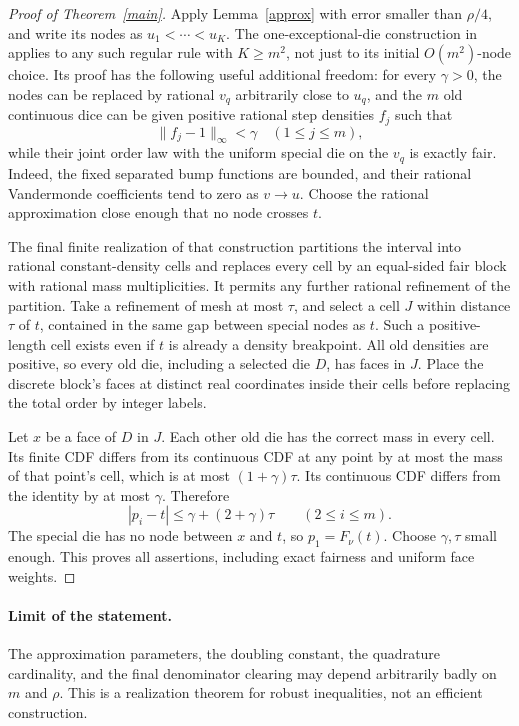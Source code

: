 \documentclass[11pt]{article}
\begin{document}
\begin{proof}[Proof of Theorem~\ref{main}]
Apply Lemma~\ref{approx} with error smaller than $\rho/4$, and write
its nodes as $u_1<\cdots<u_K$. The one-exceptional-die construction
in  applies to any
such regular rule with $K\ge m^2$, not just to its initial
$O(m^2)$-node choice. Its proof has the following useful additional
freedom: for every $\gamma>0$, the nodes can be replaced by rational
$v_q$ arbitrarily close to $u_q$, and the $m$ old continuous dice
can be given positive rational step densities $f_j$ such that
\[
 \|f_j-1\|_\infty<\gamma\quad(1\le j\le m),
\]
while their joint order law with the uniform special die on the
$v_q$ is exactly fair. Indeed, the fixed separated bump functions
are bounded, and their rational Vandermonde coefficients tend to
zero as $v\to u$. Choose the rational approximation close enough
that no node crosses $t$.

The final finite realization of that construction partitions the
interval into rational constant-density cells and replaces every
cell by an equal-sided fair block with rational mass multiplicities.
It permits any further rational refinement of the partition.
Take a refinement of mesh at most $\tau$, and select a cell $J$
within distance $\tau$ of $t$, contained in the same gap between
special nodes as $t$. Such a positive-length cell exists even if
$t$ is already a density breakpoint. All old densities are positive,
so every old die, including a selected die $D$, has faces in $J$.
Place the discrete block's faces at distinct real coordinates inside
their cells before replacing the total order by integer labels.

Let $x$ be a face of $D$ in $J$. Each other old die has the correct
mass in every cell. Its finite CDF differs from its continuous CDF
at any point by at most the mass of that point's cell, which is at
most $(1+\gamma)\tau$. Its continuous CDF differs from the identity
by at most $\gamma$. Therefore
\[
 |p_i-t|\le\gamma+(2+\gamma)\tau\qquad(2\le i\le m).
\]
The special die has no node between $x$ and $t$, so
$p_1=F_\nu(t)$. Choose $\gamma,\tau$ small enough. This proves all
assertions, including exact fairness and uniform face weights.
\end{proof}

\paragraph{Limit of the statement.}
The approximation parameters, the doubling constant, the quadrature
cardinality, and the final denominator clearing may depend arbitrarily
badly on $m$ and $\rho$. This is a realization theorem for robust
inequalities, not an efficient construction.
\end{document}
